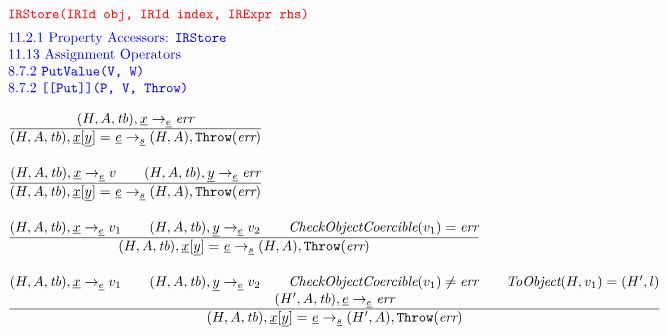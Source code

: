 \[
\begin{array}{l@{~~}l@{~~}ll}
\mtt{\normalsize\inred IRStore(IRId obj, IRId index, IRExpr rhs)}\\[.5em]
\mbox{\inblue 11.2.1 Property Accessors: {\tt IRStore}}\\
\mbox{\inblue 11.13 Assignment Operators}\\
\mbox{\inblue 8.7.2 {\tt PutValue(V, W)}}\\
\mbox{\inblue 8.7.2 {\tt [[Put]](P, V, Throw)}}\\[1em]

\frac{\begin{matrix}
\evale, \irid \rightarrow_{\ir\expr} \err
\end{matrix}}{\begin{matrix}
\state, \irid{\tt[}\ir{y}{\tt] =} \ \irexpr \rightarrow_{\ir\stmt}
\res, \error
\end{matrix}}
\\[2em]

\frac{\begin{matrix}
\evale, \irid \rightarrow_{\ir\expr} v
\rulesep
\evale, \ir{y} \rightarrow_{\ir\expr} \err
\end{matrix}}{\begin{matrix}
\state, \irid{\tt[}\ir{y}{\tt] =} \ \irexpr \rightarrow_{\ir\stmt}
\res, \error
\end{matrix}}
\\[2em]

\frac{\begin{matrix}
\evale, \irid \rightarrow_{\ir\expr} v_1
\rulesep
\evale, \ir{y} \rightarrow_{\ir\expr} v_2
\rulesep
\hf{CheckObjectCoercible}(v_1) = \err
\end{matrix}}{\begin{matrix}
\state, \irid{\tt[}\ir{y}{\tt] =} \ \irexpr \rightarrow_{\ir\stmt}
\res, \error
\end{matrix}}
\\[2em]

\frac{\begin{matrix}
\evale, \irid \rightarrow_{\ir\expr} v_1
\rulesep
\evale, \ir{y} \rightarrow_{\ir\expr} v_2
\rulesep
\hf{CheckObjectCoercible}(v_1) \not= \err
\rulesep
\hf{ToObject}(H, v_1) = (H',l)
\\
(H', A, \tb), \irexpr \rightarrow_{\ir\expr} \err
\end{matrix}}{\begin{matrix}
\state, \irid{\tt[}\ir{y}{\tt] =} \ \irexpr \rightarrow_{\ir\stmt}
(H',A), \error
\end{matrix}}
\\[2em]


\end{array}\]
